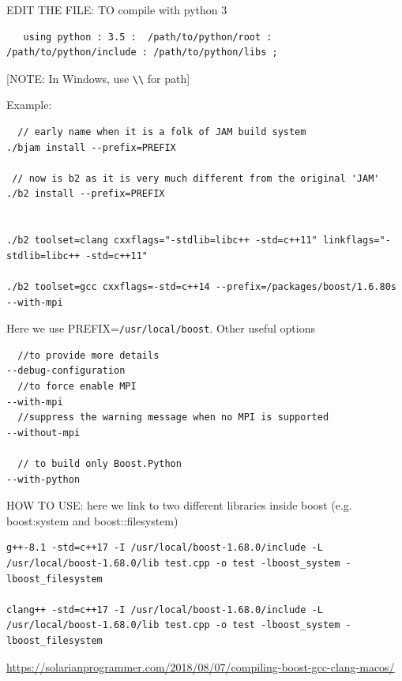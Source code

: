EDIT THE FILE: TO compile with python 3
\begin{verbatim}
   using python : 3.5 :  /path/to/python/root : /path/to/python/include : /path/to/python/libs ;
\end{verbatim}
[NOTE: In Windows, use \verb!\\! for path]

Example:
\begin{verbatim}
  // early name when it is a folk of JAM build system
./bjam install --prefix=PREFIX

 // now is b2 as it is very much different from the original 'JAM'
./b2 install --prefix=PREFIX


./b2 toolset=clang cxxflags="-stdlib=libc++ -std=c++11" linkflags="-stdlib=libc++ -std=c++11" 

./b2 toolset=gcc cxxflags=-std=c++14 --prefix=/packages/boost/1.6.80s --with-mpi
\end{verbatim}

Here we use PREFIX=\verb!/usr/local/boost!. Other useful options
\begin{verbatim} 
  //to provide more details
--debug-configuration 
  //to force enable MPI
--with-mpi
  //suppress the warning message when no MPI is supported
--without-mpi

  // to build only Boost.Python
--with-python
\end{verbatim}


HOW TO USE: here we link to two different libraries inside boost (e.g. boost:system and boost::filesystem)
\begin{verbatim}
g++-8.1 -std=c++17 -I /usr/local/boost-1.68.0/include -L /usr/local/boost-1.68.0/lib test.cpp -o test -lboost_system -lboost_filesystem

clang++ -std=c++17 -I /usr/local/boost-1.68.0/include -L /usr/local/boost-1.68.0/lib test.cpp -o test -lboost_system -lboost_filesystem

\end{verbatim}

\url{https://solarianprogrammer.com/2018/08/07/compiling-boost-gcc-clang-macos/}

